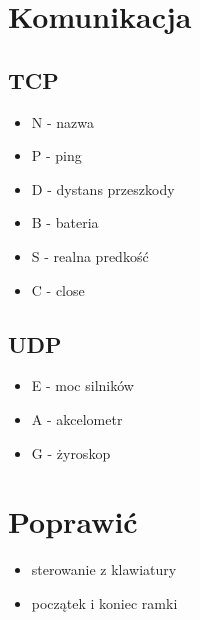 \documentclass[12pt,a4paper,polish]{article}
\begin{document}
  \section{Komunikacja}

    \subsection{TCP}
      \begin{itemize}
        \item N - nazwa
        \item P - ping
        \item D - dystans przeszkody
        \item B - bateria
        \item S - realna predkość
        \item C - close
      \end{itemize}

    \subsection{UDP}
    \begin{itemize}
      \item E - moc silników
      \item A - akcelometr
      \item G - żyroskop
    \end{itemize}

    \section{Poprawić}
    \begin{itemize}
      \item sterowanie z klawiatury
      \item początek i koniec ramki
    \end{itemize}

\end{document}

